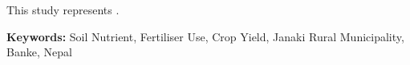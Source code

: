 

This study represents .


\textbf{Keywords:} Soil Nutrient, Fertiliser Use, Crop Yield, Janaki Rural Municipality, Banke, Nepal

